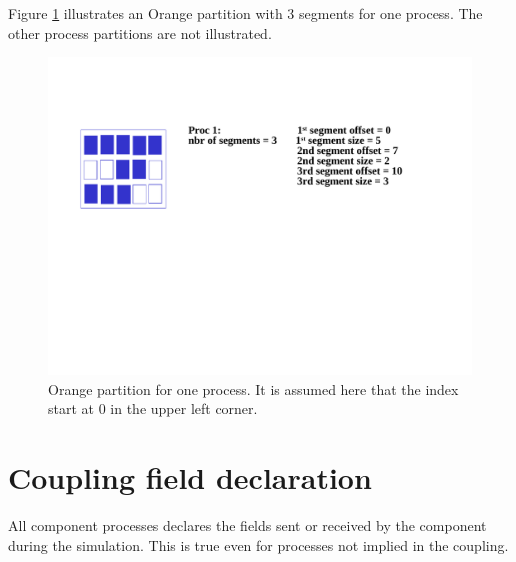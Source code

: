 Figure \ref{orange_partition} illustrates an Orange partition with 3 segments
for one process. The other process partitions are not illustrated.

\begin{figure}
\includegraphics[scale=.6]{figures/orange_new} 
\caption{Orange partition for one process. It is assumed here that the index start at 0 in the upper left corner.}
\label{orange_partition}
\end{figure} 


\section{Coupling field declaration}
 \label{subsubsec_Declaration}

All component processes declares the fields sent
or received by the component during the simulation. This is
  true even for processes not implied in the coupling. 

